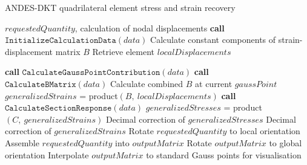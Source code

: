 \begin{algorithm}
	\onehalfspacing
	\caption{ANDES-DKT quadrilateral element stress and strain recovery}
	\label{ANDES-DKT quadrilateral element stress and strain recovery}
	\begin{algorithmic}[1]
		\Require $requestedQuantity$, calculation of nodal displacements
		\State \textbf{call} $\texttt{InitializeCalculationData}(data)$
		\State \hspace{\algorithmicindent}Calculate constant components of strain-displacement matrix $B$
		\State \hspace{\algorithmicindent}Retrieve element $localDisplacements$
		
		\State \textbf{call} $\texttt{CalculateGaussPointContribution}(data)$
		\State \hspace{\algorithmicindent}\textbf{call} $\texttt{CalculateBMatrix}(data)$
		\State \hspace{\algorithmicindent}\hspace{\algorithmicindent} Calculate combined $B$ at current $gaussPoint$
		\State $generalizedStrains$ = product$(B,\ localDisplacements)$
		\State \textbf{call} $\texttt{CalculateSectionResponse}(data)$
		\State $generalizedStresses$ = product $(C,\ generalizedStrains)$
		\State Decimal correction of $generalizedStresses$
		\EndIf
		\State Decimal correction of $generalizedStrains$ 
		\State Rotate $requestedQuantity$ to local orientation
		\EndIf
		\State Assemble $requestedQuantity$ into $outputMatrix$
		\State Rotate $outputMatrix$ to global orientation
		\EndIf
		\State Interpolate $outputMatrix$ to standard Gauss points for visualisation
		\EndWhile
	\end{algorithmic}
\end{algorithm}